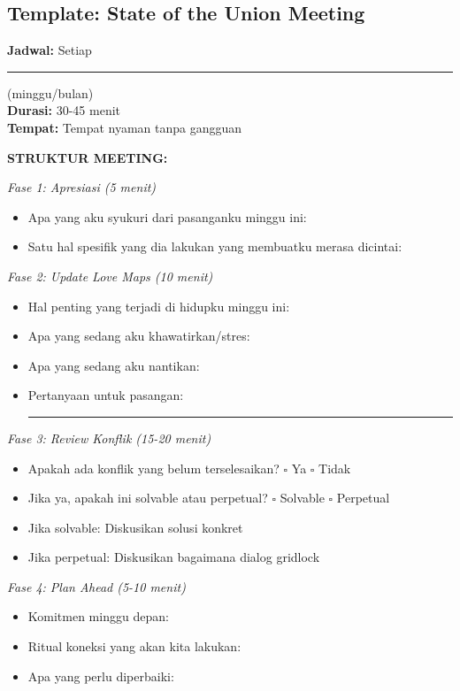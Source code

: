 \subsection{Template: State of the Union Meeting}

\begin{praktikbox}
\textbf{Jadwal:} Setiap \rule{3cm}{0.4pt} (minggu/bulan) \\
\textbf{Durasi:} 30-45 menit \\
\textbf{Tempat:} Tempat nyaman tanpa gangguan

\vspace{0.3cm}
\textbf{STRUKTUR MEETING:}

\textit{Fase 1: Apresiasi (5 menit)}
\begin{itemize}[itemsep=0.1cm]
    \item[$\square$] Apa yang aku syukuri dari pasanganku minggu ini:
    \item[$\square$] Satu hal spesifik yang dia lakukan yang membuatku merasa dicintai:
\end{itemize}

\textit{Fase 2: Update Love Maps (10 menit)}
\begin{itemize}[itemsep=0.1cm]
    \item[$\square$] Hal penting yang terjadi di hidupku minggu ini:
    \item[$\square$] Apa yang sedang aku khawatirkan/stres:
    \item[$\square$] Apa yang sedang aku nantikan:
    \item[$\square$] Pertanyaan untuk pasangan: \rule{6cm}{0.4pt}
\end{itemize}

\textit{Fase 3: Review Konflik (15-20 menit)}
\begin{itemize}[itemsep=0.1cm]
    \item[$\square$] Apakah ada konflik yang belum terselesaikan? $\square$ Ya $\square$ Tidak
    \item[$\square$] Jika ya, apakah ini solvable atau perpetual? $\square$ Solvable $\square$ Perpetual
    \item[$\square$] Jika solvable: Diskusikan solusi konkret
    \item[$\square$] Jika perpetual: Diskusikan bagaimana dialog gridlock
\end{itemize}

\textit{Fase 4: Plan Ahead (5-10 menit)}
\begin{itemize}[itemsep=0.1cm]
    \item[$\square$] Komitmen minggu depan:
    \item[$\square$] Ritual koneksi yang akan kita lakukan:
    \item[$\square$] Apa yang perlu diperbaiki:
\end{itemize}
\end{praktikbox}

